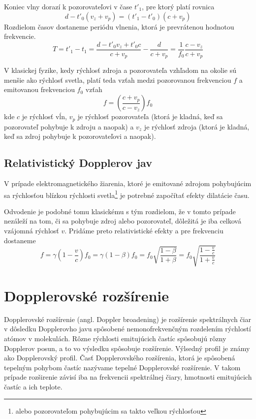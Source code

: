 \documentclass[../../main.tex]{subfiles}
\begin{document}
Koniec vlny dorazí k pozorovateľovi v čase $t'_1$, pre ktorý platí rovnica
\begin{equation}
d-t'_0 (v_z+v_p)=(t'_1-t'_0)(c+v_p)
\end{equation}
Rozdielom časov dostaneme periódu vlnenia, ktorá je prevrátenou hodnotou frekvencie.
\begin{equation}
T=t'_1-t_1=\dfrac{d-t'_0v_z+t'_0c}{c+v_p}-\dfrac{d}{c+v_p}=\dfrac{1}{f_0}\dfrac{c-v_z}{c+v_p}
\end{equation}

V klasickej fyzike, kedy rýchlosť zdroja a pozorovateľa vzhľadom na okolie sú menšie ako rýchlosť svetla, platí teda vzťah medzi pozorovanou frekvenciou $f$ a emitovanou frekvenciou $f_0$ vzťah
\begin{equation}
f=\left(\dfrac{c+v_p}{c-v_z}\right) f_0
\end{equation}
kde $c$ je rýchlosť vĺn, $v_p$ je rýchlosť pozorovateľa (ktorá je kladná, keď sa pozorovateľ pohybuje k zdroju a naopak) a $v_z$ je rýchlosť zdroja (ktorá je kladná, keď sa zdroj pohybuje k pozorovateľovi a naopak).

\subsection{Relativistický Dopplerov jav}

V prípade elektromagnetického žiarenia, ktoré je emitované zdrojom pohybujúcim sa rýchlosťou blízkou rýchlosti svetla\footnote{alebo pozorovateľom pohybujúcim sa takto veľkou rýchlosťou} je potrebné započítať efekty dilatácie času.

Odvodenie je podobné tomu klasickému s tým rozdielom, že v tomto prípade nezáleží na tom, či sa pohybuje zdroj alebo pozorovateľ, dôležitá je iba celková vzájomná rýchlosť $v$. Pridáme preto relativistické efekty a pre frekvenciu dostaneme
\begin{equation}
f=\gamma \left( 1-\dfrac{v}{c}\right)f_0=\gamma(1-\beta)f_0=f_0\sqrt{\dfrac{1-\beta}{1+\beta}}=f_0\sqrt{\dfrac{1-\frac{v}{c}}{1+\frac{v}{c}}}
\end{equation}

\section{Dopplerovské rozšírenie}

Dopplerovské rozšírenie (angl. Doppler broadening) je rozšírenie spektrálnych čiar v dôsledku Dopplerovho javu spôsobené nemonofrekvenčným rozdelením rýchlostí atómov v molekulách. Rôzne rýchlosti emitujúcich častíc spôsobujú rôzny Dopplerov posun, a to vo výsledku spôsobuje rozšírenie. Výlsedný profil je známy ako Dopplerovský profil. Časť Dopplerovského rozšírenia, ktorá je spôsobená tepelným pohybom častíc nazývame tepelné Dopplerovské rozšírenie. V takom prípade rozširenie závisí iba na frekvencii spektrálnej čiary, hmotnosti emitujúcich častíc a ich teplote.
\end{document}
